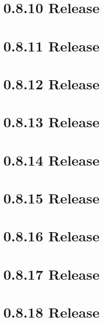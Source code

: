 \let\mypdfximage\pdfximage\def\pdfximage{\immediate\mypdfximage}\documentclass[twoside]{book}
\newcommand{\+}{\discretionary{\mbox{\scriptsize$\hookleftarrow$}}{}{}}
\begin{document}
\chapter{0.8.10 Release}
\label{doc_news_2014-12-02_0_8_10_md}

\chapter{0.8.11 Release}
\label{doc_news_2015-04-03_0_8_11_md}

\chapter{0.8.12 Release}
\label{doc_news_2015-07-13_0_8_12_md}

\chapter{0.8.13 Release}
\label{doc_news_2015-09-17_0_8_13_md}

\chapter{0.8.14 Release}
\label{doc_news_2015-11-19_0_8_14_md}

\chapter{0.8.15 Release}
\label{doc_news_2016-02-16_0_8_15_md}

\chapter{0.8.16 Release}
\label{doc_news_2016-04-29_0_8_16_md}

\chapter{0.8.17 Release}
\label{doc_news_2016-06-14_0_8_17_md}

\chapter{0.8.18 Release}
\label{doc_news_2016-09-17_0_8_18_md}

\end{document}
